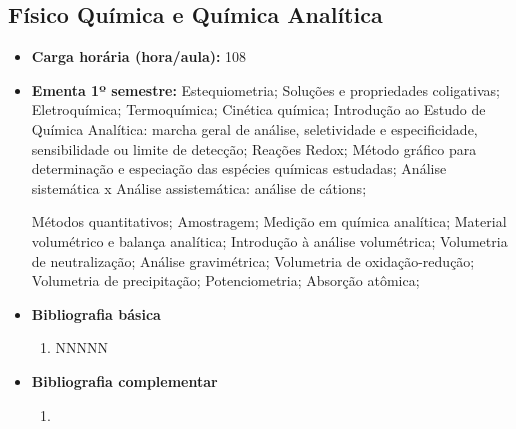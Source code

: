 \documentclass[11pt,fleqn]{book} %
\begin{document}
\subsection{Físico Química e Química Analítica}\label{disc:analitica}
\begin{itemize}
	\item \textbf{Carga horária (hora/aula):} 108
	\item \textbf{Ementa 1º semestre:}
	Estequiometria; Soluções e propriedades coligativas; 
	Eletroquímica;
	Termoquímica; Cinética química; 
	Introdução ao Estudo de Química Analítica: marcha geral de análise, seletividade e especificidade, sensibilidade ou limite de detecção; 
	Reações Redox; 
	Método gráfico para determinação e especiação das espécies químicas estudadas;
	Análise sistemática x Análise assistemática: análise de cátions;
	
	Métodos quantitativos; Amostragem; 
	Medição em química analítica; 
	Material volumétrico e balança analítica; Introdução à análise volumétrica; 
	Volumetria de neutralização; 
	Análise gravimétrica; 
	Volumetria de oxidação-redução; 
	Volumetria de precipitação; 
	Potenciometria; 
	Absorção atômica;
	\item \textbf{Bibliografia básica}
	\begin{enumerate}
		\item NNNNN
	\end{enumerate}
	\item \textbf{Bibliografia complementar}
	\begin{enumerate}
		\item 
	\end{enumerate}	
\end{itemize}

\newpage
\end{document}
